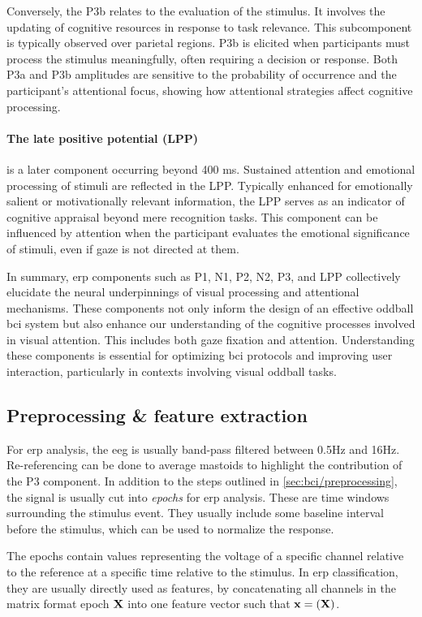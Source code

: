 Conversely, the P3b relates to the evaluation of the stimulus.
It involves the updating of cognitive resources in response to task relevance.
This subcomponent is typically observed over parietal regions.
P3b is elicited when participants must process the stimulus meaningfully, often
requiring a decision or response.
Both P3a and P3b amplitudes are sensitive to the probability of occurrence and the
participant's attentional focus, showing how attentional strategies affect cognitive
processing.

\paragraph{The late positive potential (LPP)} is a later component occurring beyond 400 ms.
Sustained attention and emotional processing of stimuli are reflected in the LPP.
Typically enhanced for emotionally salient or motivationally relevant information, the
LPP serves as an indicator of cognitive appraisal beyond mere recognition tasks.
This component can be influenced by attention when the participant evaluates the
emotional significance of stimuli, even if gaze is not directed at them.

In summary, \ac{erp} components such as P1, N1, P2, N2, P3, and LPP collectively
elucidate the neural underpinnings of visual processing and attentional mechanisms.
These components not only inform the design of an effective oddball \ac{bci} system but
also enhance our understanding of the cognitive processes involved in visual attention.
This includes both gaze fixation and attention.
Understanding these components is essential for optimizing \ac{bci} protocols and
improving user interaction, particularly in contexts involving visual oddball tasks.


\subsection{Preprocessing \& feature extraction}
For \ac{erp} analysis, the \ac{eeg} is usually band-pass filtered between 0.5Hz and
16Hz.
Re-referencing can be done to average mastoids to highlight the contribution of the P3
component.
In addition to the steps outlined in \cref{sec:bci/preprocessing}, the signal is
usually cut into \emph{epochs} for \ac{erp} analysis.
These are time windows surrounding the stimulus event.
They usually include some baseline interval before the stimulus, which can be used to
normalize the response.

The epochs contain values representing the voltage of a specific channel relative to the
reference at a specific time relative to the stimulus.
In \ac{erp} classification, they are usually directly used as features, by concatenating
all channels in the matrix format epoch $\mathbf{X}$ into one feature vector such that
$\mathbf{x} = \mathbf{(}\mathbf{X})$.

